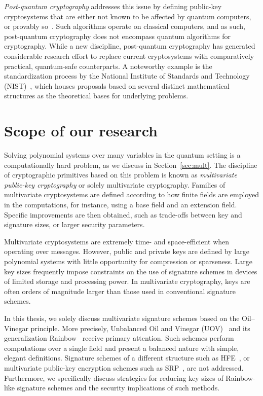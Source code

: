 \documentclass[english]{ufsc-thesis-rn46-2019/ufsc-thesis-rn46-2019}
\theoremstyle{definition}
\begin{document}
\emph{Post-quantum cryptography} addresses this issue by defining public-key
cryptosystems that are either not known to be affected by quantum computers, or
provably so~\cite{Bernstein:2008}. Such algorithms operate on classical
computers, and as such, post-quantum cryptography does not encompass quantum
algorithms for cryptography. While a new discipline, post-quantum cryptography
has generated considerable research effort to replace current cryptosystems
with comparatively practical, quantum-safe counterparts. A noteworthy example
is the standardization process by the National Institute of Standards and
Technology (NIST)~\cite{Alagic:201901,Alagic:202007}, which houses proposals
based on several distinct mathematical structures as the theoretical bases for
underlying problems.

\section{Scope of our research}

Solving polynomial systems over many variables in the quantum setting is
a computationally hard problem, as we discuss in Section~\ref{sec:mult}. The
discipline of cryptographic primitives based on this problem is known as
\textit{multivariate public-key cryptography} or solely multivariate
cryptography. Families of multivariate cryptosystems are defined according to
how finite fields are employed in the computations, for instance, using a base
field and an extension field. Specific improvements are then obtained, such as
trade-offs between key and signature sizes, or larger security parameters.

Multivariate cryptosystems are extremely time- and space-efficient when
operating over messages. However, public and private keys are defined by large
polynomial systems with little opportunity for compression or sparseness. Large
key sizes frequently impose constraints on the use of signature schemes in
devices of limited storage and processing power. In multivariate cryptography,
keys are often orders of magnitude larger than those used in conventional
signature schemes.

In this thesis, we solely discuss multivariate signature schemes based on the
Oil--Vinegar principle. More precisely, Unbalanced Oil and Vinegar
(UOV)~\cite{Kipnis:199904} and its generalization Rainbow~\cite{Ding:200506}
receive primary attention. Such schemes perform computations over a single
field and present a balanced nature with simple, elegant definitions. Signature
schemes of a different structure such as HFE~\cite{Patarin:199605}, or
multivariate public-key encryption schemes such as SRP~\cite{Duong:201607}, are
not addressed. Furthermore, we specifically discuss strategies for reducing key
sizes of Rainbow-like signature schemes and the security implications of such
methods.
\end{document}
